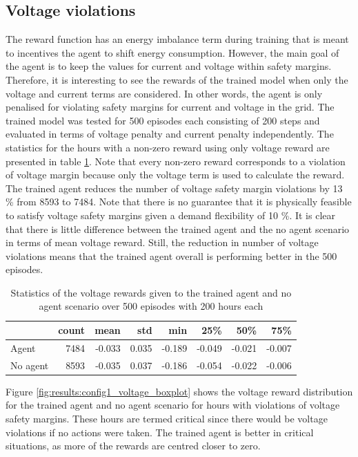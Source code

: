 \documentclass[class=book, crop=false, 11pt]{standalone}
\begin{document}
\subsection{Voltage violations}
The reward function has an energy imbalance term during training that is meant to incentives the agent to shift energy consumption. However, the main goal of the agent is to keep the values for current and voltage within safety margins. Therefore, it is interesting to see the rewards of the trained model when only the voltage and current terms are considered. In other words, the agent is only penalised for violating safety margins for current and voltage in the grid. The trained model was tested for 500 episodes each consisting of 200 steps and evaluated
in terms of voltage penalty and current penalty independently. The statistics for the hours with a non-zero reward using only voltage reward are presented in table \ref{table:results:configuration1_reward_500_episodes}. Note that every non-zero reward corresponds to a violation of voltage margin because only the voltage term is used to calculate the reward. The trained agent reduces the number of voltage safety margin violations by 13 \% from 8593 to 7484. Note that there is no guarantee that it is physically feasible to satisfy voltage safety margins given a demand flexibility of 10 \%. It is clear that there is little difference between the trained agent and the no agent scenario in terms of mean voltage reward. Still, the reduction in number of voltage violations means that the trained agent overall is performing better in the 500 episodes. 
\begin{table}[h]
\center
\caption{Statistics of the voltage rewards given to the trained agent and no agent scenario over 500 episodes with 200 hours each}
\begin{tabular}{l|rrrrrrr}
         & count & mean   & std   & min    & 25\%   & 50\%   & 75\%   \\
\hline
Agent    & 7484  & -0.033 & 0.035 & -0.189 & -0.049 & -0.021 & -0.007 \\
No agent & 8593  & -0.035 & 0.037 & -0.186 & -0.054 & -0.022 & -0.006 \\
\hline
\end{tabular}
\label{table:results:configuration1_reward_500_episodes}
\end{table}

Figure \ref{fig:results:config1_voltage_boxplot} shows the voltage reward distribution for the trained agent and no agent scenario for hours with violations of voltage safety margins. These hours are termed critical since there would be voltage violations if no actions were taken. The trained agent is better in critical situations, as more of the rewards are centred closer to zero.
\end{document}
